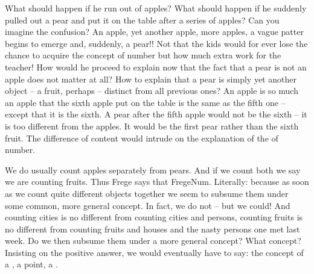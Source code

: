 What should happen if he run out of apples? What should happen if he suddenly
pulled out a pear and put it on the table after a series of apples?  Can you
imagine the confusion?  An apple, yet another apple, more apples, a vague patter
begins to emerge and, suddenly, a pear!!  Not that the kids would for ever lose
the chance to acquire the concept of number but how much extra work for the
teacher!  How would he proceed to explain now that the fact that a pear is not
an apple does not matter at all?  How to explain that a pear is simply yet
another object -- a fruit, perhaps -- distinct from all previous ones?  An apple
is so much an apple that the sixth apple put on the table is the same as the
fifth one -- except that it is the sixth.  A pear after the fifth apple would
not be the sixth -- it is too different from the apples.  It would be the first
pear rather than the sixth fruit.  The difference of content would intrude on
the explanation of the  of number.

We do usually count apples separately from pears.  And if we count both we say
we are counting fruits.  Thus Frege says that \citet{number is the extension of
  a concept}{FregeNum}{{}. Literally: } because as soon as we count quite different objects
together we seem to subsume them under some common, more general concept.
%
In fact, we do not -- but we could!  And counting cities is no different from
counting cities and persons, counting fruits is no different from counting
fruits and houses and the nasty persons one met last week.  Do we then subsume
them under a more general concept? What concept? Insisting on the positive
answer, we would eventually have to say: the concept of a ,
a point, a .

